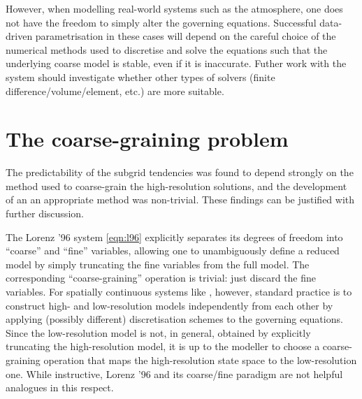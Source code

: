 \documentclass[../main.tex]{subfiles}
\begin{document}
However, when modelling real-world systems such as the atmosphere, one does
not have the freedom to simply alter the governing equations. Successful
data-driven parametrisation in these cases will depend on the careful choice of
the numerical methods used to discretise and solve the equations such that
the underlying coarse model is stable, even if it is inaccurate. Futher work
with the \rb{} system should investigate whether other types of solvers
(finite difference/volume/element, etc.) are more suitable.


\section{The coarse-graining problem}

The predictability of the subgrid tendencies was found to depend strongly on
the method used to coarse-grain the high-resolution solutions, and the
development of an an appropriate method was non-trivial. These findings
can be justified with further discussion.

The Lorenz '96 system \cref{eqn:l96} explicitly separates its degrees of
freedom into ``coarse'' and ``fine'' variables, allowing one to unambiguously
define a reduced model by simply truncating the fine variables from the full
model. The corresponding ``coarse-graining'' operation is trivial: just discard
the fine variables. For spatially continuous systems like \rb{}, however,
standard practice is to construct high- and low-resolution models independently
from each other by applying (possibly different) discretisation schemes to the
governing equations. Since the low-resolution model is not, in general,
obtained by explicitly truncating the high-resolution model, it is up to the
modeller to choose a coarse-graining operation that maps the high-resolution
state space to the low-resolution one. While instructive, Lorenz '96 and its
coarse/fine paradigm are not helpful analogues in this respect.
\end{document}
